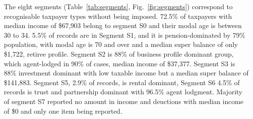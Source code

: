 The eight segments (Table~\ref{tab:segments}, Fig.~\ref{fig:segments}) correspond to recognisable taxpayer types without being imposed. 72.5\% of taxpayers with median income of \$67,903 belong to segment S0 and their modal age is between 30 to 34. 5.5\% of records are in Segment S1, and it is pension-dominated by 79\% population, with modal age is 70 and over and a median super balance of only \$1,722, retiree profile. Segment S2 is 88\% of business profile dominant group, which agent-lodged in 90\% of cases, median income of \$37,377. Segment S3 is 88\% investment dominant with low taxable income but a median super balance of \$141,883. Segment S5, 2.9\% of records, is rental dominant, Segment S6 4.5\% of records is trust and partnership dominant with 96.5\% agent lodgment. Majority of segment S7 reported no amount in income and deuctions with median income of \$0 and only one item being reported.

\begin{table}[H]
    \centering
    \caption{Segment profiles (medians in AUD).}
    \label{tab:segments}
    \footnotesize
\end{table}

